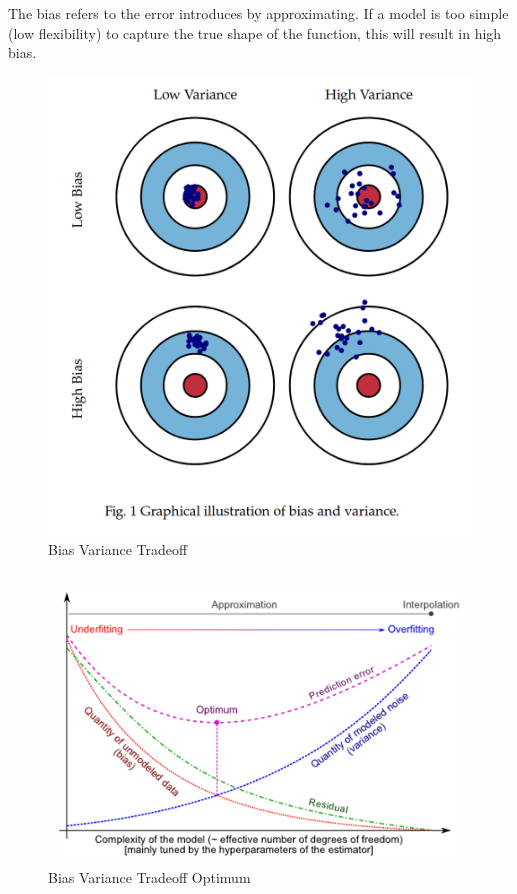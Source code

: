\documentclass[../Main.tex]{subfiles}
\begin{document}
The bias refers to the error introduces by approximating. If a model is too simple (low flexibility) to capture the true shape of the function, this will result in high bias.

\begin{figure}[H]
    \centering
    \includegraphics[width=0.5\linewidth]{Images/bias-variance-tradeoff.png}
    \caption{Bias Variance Tradeoff}
    \label{fig:enter-label}
\end{figure}
\begin{figure}[H]
    \centering
    \includegraphics[width=0.5\linewidth]{Images/bias-variance-optimum.png}
    \caption{Bias Variance Tradeoff Optimum}
    \label{fig:enter-label}
\end{figure}
\newpage
{}
\end{document}
